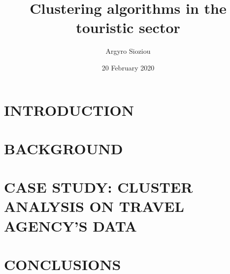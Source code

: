 \documentclass[
12pt, %
onside] %
{book} %
\title{Clustering algorithms in the touristic sector}
\author{Argyro Sioziou}
\date{20 February 2020}
\begin{document}


\tableofcontents

\chapter{INTRODUCTION}


\chapter{BACKGROUND}


\chapter{CASE STUDY: CLUSTER ANALYSIS ON TRAVEL AGENCY'S DATA}


\chapter{CONCLUSIONS}


\printbibliography
\end{document}
